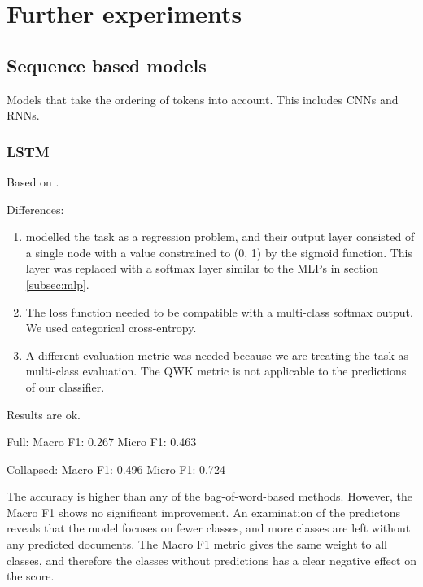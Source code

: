 \chapter{Further experiments}

\section{Sequence based models}

Models that take the ordering of tokens into account.
This includes \acp{CNN} and \acp{RNN}.

\subsection{LSTM}

Based on \textcite{taghipour16}.

Differences:

\begin{enumerate}
    \item \citeauthor{taghipour16} modelled the task as a regression problem,
        and their output layer consisted of a single node with a value constrained
        to (0, 1) by the sigmoid function. This layer was replaced with a softmax
        layer similar to the \acp{MLP} in section \ref{subsec:mlp}.
    \item The loss function needed to be compatible with a multi-class softmax
        output. We used categorical cross-entropy.
    \item A different evaluation metric was needed because we are treating the task
        as multi-class evaluation. The \ac{QWK} metric is not applicable to
        the predictions of our classifier.
\end{enumerate}

Results are ok.

Full:
Macro F1: 0.267
Micro F1: 0.463

Collapsed:
Macro F1: 0.496
Micro F1: 0.724

The accuracy is higher than any of the bag-of-word-based methods. However, the
Macro F1 shows no significant improvement. An examination of the predictons
reveals that the model focuses on fewer classes, and more classes are left
without any predicted documents. The Macro F1 metric gives the same weight to
all classes, and therefore the classes without predictions has a clear
negative effect on the score.


